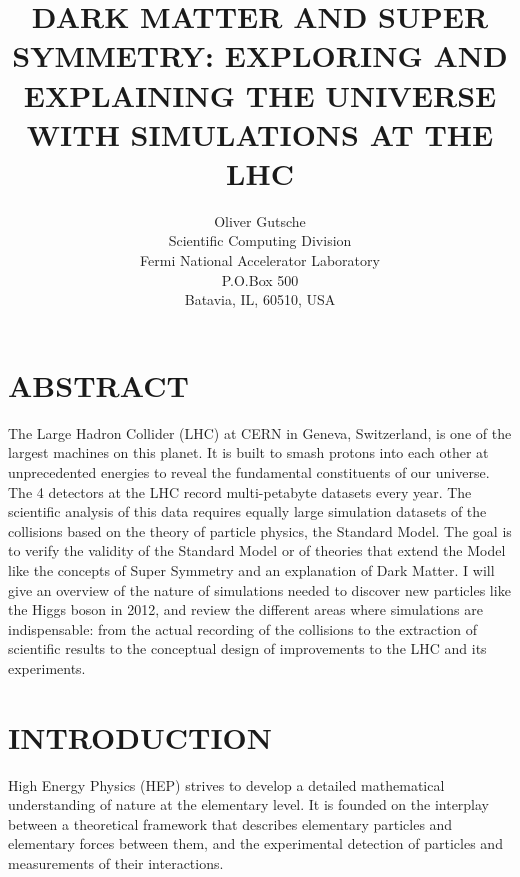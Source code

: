 \documentclass{wscpaperproc}
\theoremstyle{wsc}
\begin{document}
%
%

\title{DARK MATTER AND SUPER SYMMETRY: EXPLORING AND EXPLAINING THE UNIVERSE WITH SIMULATIONS AT THE LHC}

\author{Oliver Gutsche\\ [12pt]
Scientific Computing Division \\
Fermi National Accelerator Laboratory\\
P.O.Box 500\\
Batavia, IL, 60510, USA\\
}

\maketitle

\section*{ABSTRACT}
The Large Hadron Collider (LHC) at CERN in Geneva, Switzerland, is one of the largest machines on this planet. It is built to smash protons into each other at unprecedented energies to reveal the fundamental constituents of our universe. The 4 detectors at the LHC record multi-petabyte datasets every year. The scientific analysis of this data requires equally large simulation datasets of the collisions based on the theory of particle physics, the Standard Model. The goal is to verify the validity of the Standard Model or of theories that extend the Model like the concepts of Super Symmetry and an explanation of Dark Matter. I will give an overview of the nature of simulations needed to discover new particles like the Higgs boson in 2012, and review the different areas where simulations are indispensable: from the actual recording of the collisions to the extraction of scientific results to the conceptual design of improvements to the LHC and its experiments.

\section{INTRODUCTION}
\label{sec:intro}
High Energy Physics (HEP) strives to develop a detailed mathematical understanding of nature at the elementary level. It is founded on the interplay between a theoretical framework that describes elementary particles and elementary forces between them, and the experimental detection of particles and measurements of their interactions.
\end{document}
